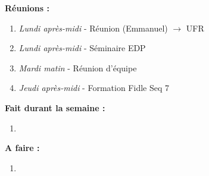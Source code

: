 \textbf{Réunions :}
\begin{enumerate}[label=\textbullet]
	\item \textit{Lundi après-midi} - Réunion (Emmanuel) $\rightarrow$ UFR
	\item \textit{Lundi après-midi} - Séminaire EDP
	\item \textit{Mardi matin} - Réunion d'équipe
	\item \textit{Jeudi après-midi} - Formation Fidle Seq 7
\end{enumerate}
\textbf{Fait durant la semaine :}
\begin{enumerate}[label=\textbullet]
	\item 
\end{enumerate}
\textbf{A faire :}
\begin{enumerate}[label=\textbullet]
	\item 
\end{enumerate}